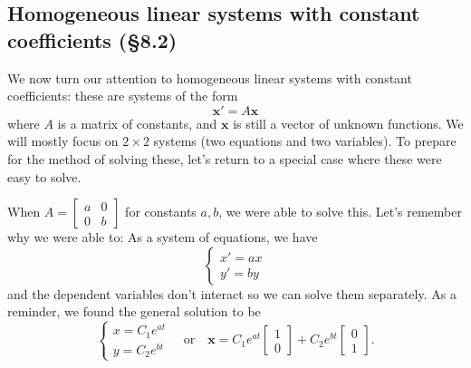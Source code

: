 \documentclass[12pt]{amsart}
\numberwithin{equation}{section}
\theoremstyle{plain} %
\theoremstyle{definition}
\theoremstyle{remark}
\begin{document}



\subsection*{Homogeneous linear systems with constant coefficients (\S8.2)}

We now turn our attention to homogeneous linear systems with constant coefficients: these are systems of the form
\[ \mathbf{x}' = A \mathbf{x}\]
where $A$ is a matrix of constants, and $\mathbf{x}$ is still a vector of unknown functions.
We will mostly focus on $2\times 2$ systems (two equations and two variables). To prepare for the method of solving these, let's return to a special case where these were easy to solve.

When $A=\begin{bmatrix} a & 0 \\ 0 & b\end{bmatrix}$ for constants $a,b$, we were able to solve this. Let's remember why we were able to:
As a system of equations, we have
\[ \begin{cases} x' = ax \\ y' = by\end{cases}\]
 and the dependent variables don't interact so we can solve them separately. As a reminder, we found the general solution to be
 \[ \begin{cases} x = C_1 e^{at} \\ y=C_2 e^{bt} \end{cases} \quad \text{or} \quad \mathbf{x} = C_1 e^{at} \begin{bmatrix} 1 \\ 0 \end{bmatrix} + C_2 e^{bt}  \begin{bmatrix} 0 \\ 1 \end{bmatrix} .\]
\end{document}
